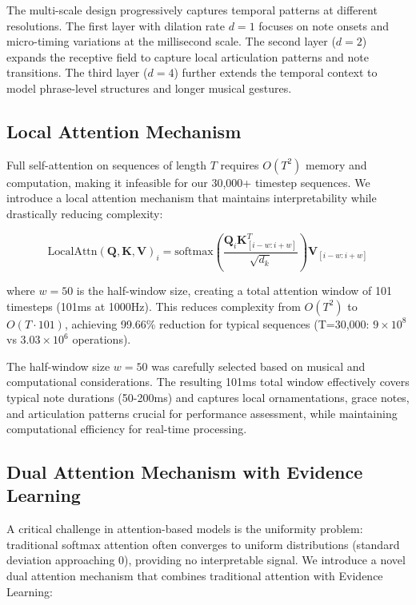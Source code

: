 \documentclass[sigconf,review,anonymous]{acmart}
\begin{document}
The multi-scale design progressively captures temporal patterns at different resolutions. The first layer with dilation rate $d=1$ focuses on note onsets and micro-timing variations at the millisecond scale. The second layer ($d=2$) expands the receptive field to capture local articulation patterns and note transitions. The third layer ($d=4$) further extends the temporal context to model phrase-level structures and longer musical gestures.

\subsection{Local Attention Mechanism}

Full self-attention on sequences of length $T$ requires $O(T^2)$ memory and computation, making it infeasible for our 30,000+ timestep sequences. We introduce a local attention mechanism that maintains interpretability while drastically reducing complexity:

\begin{equation}
\text{LocalAttn}(\mathbf{Q}, \mathbf{K}, \mathbf{V})_i = \text{softmax}\left(\frac{\mathbf{Q}_i \mathbf{K}_{[i-w:i+w]}^T}{\sqrt{d_k}}\right)\mathbf{V}_{[i-w:i+w]}
\end{equation}

where $w=50$ is the half-window size, creating a total attention window of 101 timesteps (101ms at 1000Hz). This reduces complexity from $O(T^2)$ to $O(T \cdot 101)$, achieving 99.66\% reduction for typical sequences (T=30,000: $9 \times 10^8$ vs $3.03 \times 10^6$ operations).

The half-window size $w=50$ was carefully selected based on musical and computational considerations. The resulting 101ms total window effectively covers typical note durations (50-200ms) and captures local ornamentations, grace notes, and articulation patterns crucial for performance assessment, while maintaining computational efficiency for real-time processing.

\subsection{Dual Attention Mechanism with Evidence Learning}

A critical challenge in attention-based models is the uniformity problem: traditional softmax attention often converges to uniform distributions (standard deviation approaching 0), providing no interpretable signal. We introduce a novel dual attention mechanism that combines traditional attention with Evidence Learning:
\end{document}

